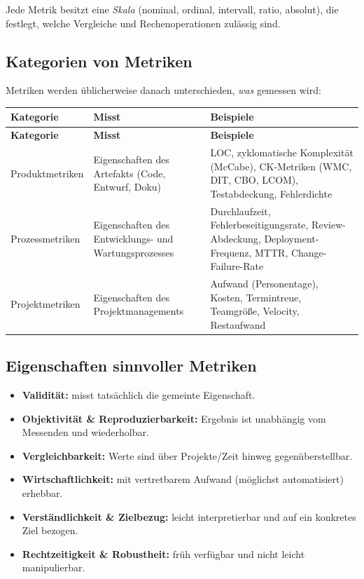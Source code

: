\documentclass[
	fontsize=12pt,          %
	paper=a4,               %
	numbers=noenddot,       %
	listof=totoc,           %
	listof=entryprefix,     %
	listof=nochaptergap,    %
	bibliography=totoc,     %
	parskip=half,           %
	openany                 %
]{scrbook}
\begin{document}
Jede Metrik besitzt eine \emph{Skala} (nominal, ordinal, intervall, ratio,
absolut), die festlegt, welche Vergleiche und Rechenoperationen zulässig sind.

\subsection*{Kategorien von Metriken}

Metriken werden üblicherweise danach unterschieden, \emph{was} gemessen wird:

\begin{longtable}{| p{2.8cm} | p{4.5cm} | p{5.0cm} |}
	\hline
	\textbf{Kategorie} & \textbf{Misst} & \textbf{Beispiele} \\ \hline
	\endfirsthead
	\hline
	\textbf{Kategorie} & \textbf{Misst} & \textbf{Beispiele} \\ \hline
	\endhead
	\hline
	\endfoot
	Produkt\-metriken & Eigenschaften des Artefakts (Code, Entwurf, Doku) &
	LOC, zyklomatische Komplexität (McCabe), CK-Metriken (WMC, DIT, CBO, LCOM),
	Testabdeckung, Fehlerdichte \\ \hline
	Prozess\-metriken & Eigenschaften des Entwicklungs- und Wartungsprozesses &
	Durchlaufzeit, Fehlerbeseitigungsrate, Review-Abdeckung, Deployment-Frequenz,
	MTTR, Change-Failure-Rate \\ \hline
	Projekt\-metriken & Eigenschaften des Projektmanagements &
	Aufwand (Personentage), Kosten, Termintreue, Teamgröße, Velocity,
	Restaufwand \\ \hline
\end{longtable}

\subsection*{Eigenschaften sinnvoller Metriken}

\begin{itemize}
	\item \textbf{Validität:} misst tatsächlich die gemeinte Eigenschaft.
	\item \textbf{Objektivität \& Reproduzierbarkeit:} Ergebnis ist unabhängig
	      vom Messenden und wiederholbar.
	\item \textbf{Vergleichbarkeit:} Werte sind über Projekte/Zeit hinweg
	      gegenüberstellbar.
	\item \textbf{Wirtschaftlichkeit:} mit vertretbarem Aufwand (möglichst
	      automatisiert) erhebbar.
	\item \textbf{Verständlichkeit \& Zielbezug:} leicht interpretierbar und auf
	      ein konkretes Ziel bezogen.
	\item \textbf{Rechtzeitigkeit \& Robustheit:} früh verfügbar und nicht
	      leicht manipulierbar.
\end{itemize}
\end{document}
